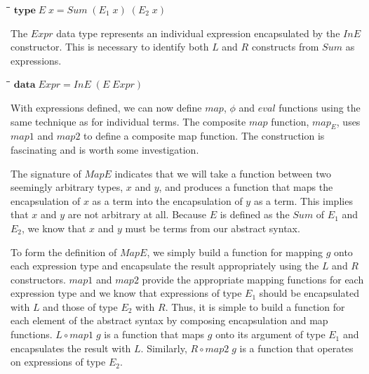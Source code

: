 \documentclass[10pt]{article}
\newlength{\lwidth}\setlength{\lwidth}{4.5cm}
\newlength{\cwidth}\setlength{\cwidth}{8mm} %
\newcommand{\Conid}[1]{\mathit{#1}}
\newcommand{\Varid}[1]{\mathit{#1}}
\begin{document}
\begin{tabbing}
\qquad\=\hspace{\lwidth}\=\hspace{\cwidth}\=\+\kill
${\mathbf{type}\;\Conid{E}\;\Varid{x}\mathrel{=}\Conid{Sum}\;(\Varid{E}_1\;\Varid{x})\;(\Varid{E}_2\;\Varid{x})}$
\end{tabbing}
The \ensuremath{\Conid{Expr}} data type represents an individual expression encapsulated
by the \ensuremath{\Conid{InE}} constructor.  This is necessary to identify both \ensuremath{\Conid{L}} and
\ensuremath{\Conid{R}} constructs from \ensuremath{\Conid{Sum}} as expressions.

\begin{tabbing}
\qquad\=\hspace{\lwidth}\=\hspace{\cwidth}\=\+\kill
${\mathbf{data}\;\Conid{Expr}\mathrel{=}\Conid{InE}\;(\Conid{E}\;\Conid{Expr})}$
\end{tabbing}
With expressions defined, we can now define \ensuremath{\Varid{map}}, \ensuremath{\Varid{\phi}} and \ensuremath{\Varid{eval}}
functions using the same technique as for individual terms.  The
composite \ensuremath{\Varid{map}} function, \ensuremath{\Varid{map}_E}, uses \ensuremath{\Varid{map1}} and \ensuremath{\Varid{map2}} to define a
composite map function.  The construction is fascinating and is worth
some investigation.

The signature of \ensuremath{\Conid{MapE}} indicates that we will take a function between
two seemingly arbitrary types, \ensuremath{\Varid{x}} and \ensuremath{\Varid{y}}, and produces a function
that maps the encapsulation of \ensuremath{\Varid{x}} as a term into the encapsulation
of \ensuremath{\Varid{y}} as a term.  This implies that \ensuremath{\Varid{x}} and \ensuremath{\Varid{y}} are not arbitrary at
all.  Because \ensuremath{\Conid{E}} is defined as the \ensuremath{\Conid{Sum}} of \ensuremath{\Varid{E}_1} and \ensuremath{\Varid{E}_2}, we know
that \ensuremath{\Varid{x}} and \ensuremath{\Varid{y}} must be terms from our abstract syntax.

To form the definition of \ensuremath{\Conid{MapE}}, we simply build a function for
mapping \ensuremath{\Varid{g}} onto each expression type and encapsulate the result
appropriately using the \ensuremath{\Conid{L}} and \ensuremath{\Conid{R}} constructors.  \ensuremath{\Varid{map1}} and \ensuremath{\Varid{map2}}
provide the appropriate mapping functions for each expression type and
we know that expressions of type \ensuremath{\Varid{E}_1} should be encapsulated with \ensuremath{\Conid{L}}
and those of type \ensuremath{\Varid{E}_2} with \ensuremath{\Conid{R}}.  Thus, it is simple to build a
function for each element of the abstract syntax by composing
encapsulation and map functions.  \ensuremath{\Conid{L}\mathbin{\circ}\Varid{map1}\;\Varid{g}} is a function that maps
\ensuremath{\Varid{g}} onto its argument of type \ensuremath{\Varid{E}_1} and encapsulates the result with
\ensuremath{\Conid{L}}.  Similarly, \ensuremath{\Conid{R}\mathbin{\circ}\Varid{map2}\;\Varid{g}} is a function that operates on
expressions of type \ensuremath{\Varid{E}_2}.
\end{document}
